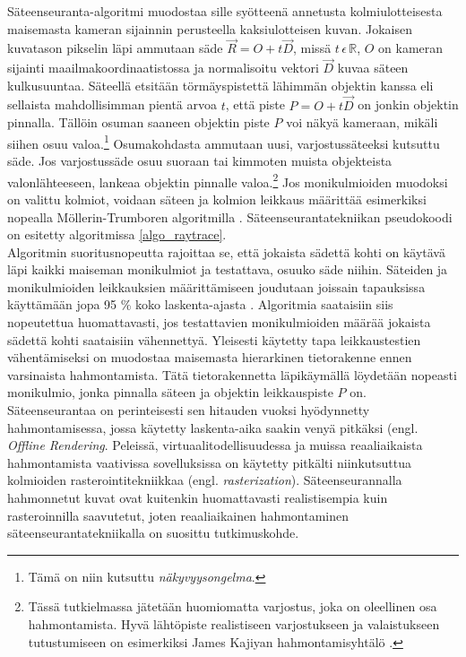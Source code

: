 ﻿\documentclass[a4paper, 12pt, titlepage]{article}
\newcommand{\R}{\mathbb{R}}
\begin{document}
Säteenseuranta-algoritmi muodostaa sille syötteenä annetusta kolmiulotteisesta maisemasta kameran sijainnin perusteella kaksiulotteisen kuvan. Jokaisen kuvatason pikselin läpi ammutaan säde $\vec{R}=O+t\vec{D}$, missä $t\,\epsilon\,\R$, $O$ on kameran sijainti maailmakoordinaatistossa ja normalisoitu vektori $\vec{D}$ kuvaa säteen kulkusuuntaa. Säteellä etsitään törmäyspistettä lähimmän objektin kanssa eli sellaista mahdollisimman pientä arvoa $t$, että piste $P=O+t\vec{D}$ on jonkin objektin pinnalla. Tällöin osuman saaneen objektin piste $P$ voi näkyä kameraan, mikäli siihen osuu valoa.\footnote{Tämä on niin kutsuttu \emph{näkyvyysongelma}.} Osumakohdasta ammutaan uusi, varjostussäteeksi kutsuttu säde. Jos varjostussäde osuu suoraan tai kimmoten muista objekteista valonlähteeseen, lankeaa objektin pinnalle valoa.\footnote{Tässä tutkielmassa jätetään huomiomatta varjostus, joka on oleellinen osa hahmontamista. Hyvä lähtöpiste realistiseen varjostukseen ja valaistukseen tutustumiseen on esimerkiksi James Kajiyan hahmontamisyhtälö \citep[ks.][]{kajiya}.}  \citep[.]{janke} Jos monikulmioiden muodoksi on valittu kolmiot, voidaan säteen ja kolmion leikkaus määrittää esimerkiksi nopealla Möllerin-Trumboren algoritmilla \citep[ks.][]{moller}. Säteenseurantatekniikan pseudokoodi on esitetty algoritmissa \ref{algo_raytrace}.\\


Algoritmin suoritusnopeutta rajoittaa se, että jokaista sädettä kohti on käytävä läpi kaikki maiseman monikulmiot ja testattava, osuuko säde niihin. Säteiden ja monikulmioiden leikkauksien määrittämiseen joudutaan joissain tapauksissa käyttämään jopa 95 \% koko laskenta-ajasta \citep{whitted}. Algoritmia saataisiin siis nopeutettua huomattavasti, jos testattavien monikulmioiden määrää jokaista sädettä kohti saataisiin vähennettyä. Yleisesti käytetty tapa leikkaustestien vähentämiseksi on muodostaa maisemasta hierarkinen tietorakenne ennen varsinaista hahmontamista. Tätä tietorakennetta läpikäymällä löydetään nopeasti monikulmio, jonka pinnalla säteen ja objektin leikkauspiste $P$ on. \citep[.]{rubin}\\

Säteenseurantaa on perinteisesti sen hitauden vuoksi hyödynnetty hahmontamisessa, jossa käytetty laskenta-aika saakin venyä pitkäksi (engl. \emph{Offline Rendering}. Peleissä, virtuaalitodellisuudessa ja muissa reaaliaikaista hahmontamista vaativissa sovelluksissa on käytetty pitkälti niinkutsuttua kolmioiden rasterointitekniikkaa (engl. \emph{rasterization}). Säteenseurannalla hahmonnetut kuvat ovat kuitenkin huomattavasti realistisempia kuin rasteroinnilla saavutetut, joten reaaliaikainen hahmontaminen säteenseurantatekniikalla on suosittu tutkimuskohde. \citep[.]{wald04}  
 
\end{document}
